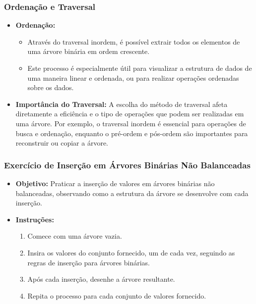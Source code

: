 \begin{frame}[fragile]
  \frametitle{Ordenação e Traversal}
  \begin{itemize}
    \item \textbf{Ordenação:}
      \begin{itemize}
        \item Através do traversal inordem, é possível extrair todos os elementos de uma árvore binária em ordem crescente.
        \item Este processo é especialmente útil para visualizar a estrutura de dados de uma maneira linear e ordenada, ou para realizar operações ordenadas sobre os dados.
      \end{itemize}
    \item \textbf{Importância do Traversal:} A escolha do método de traversal afeta diretamente a eficiência e o tipo de operações que podem ser realizadas em uma árvore. Por exemplo, o traversal inordem é essencial para operações de busca e ordenação, enquanto o pré-ordem e pós-ordem são importantes para reconstruir ou copiar a árvore.
  \end{itemize}
\end{frame}

\begin{frame}[fragile]
  \frametitle{Exercício de Inserção em Árvores Binárias Não Balanceadas}
  \begin{itemize}
    \item \textbf{Objetivo:} Praticar a inserção de valores em árvores binárias não balanceadas, observando como a estrutura da árvore se desenvolve com cada inserção.
    \item \textbf{Instruções:}
      \begin{enumerate}
        \item Comece com uma árvore vazia.
        \item Insira os valores do conjunto fornecido, um de cada vez, seguindo as regras de inserção para árvores binárias.
        \item Após cada inserção, desenhe a árvore resultante.
        \item Repita o processo para cada conjunto de valores fornecido.
      \end{enumerate}
  \end{itemize}
\end{frame}


